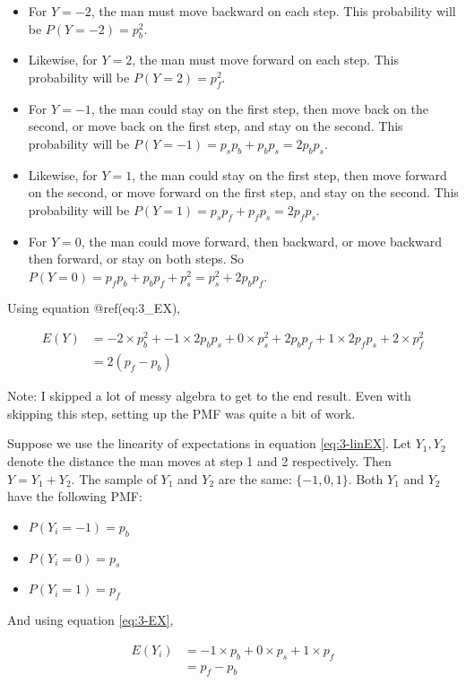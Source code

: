 \documentclass[
]{book}
\providecommand{\tightlist}{%
  \setlength{\itemsep}{0pt}\setlength{\parskip}{0pt}}
\begin{document}
\begin{itemize}
\tightlist
\item
  For \(Y=-2\), the man must move backward on each step. This probability will be \(P(Y=-2) = p_b^2\).
\item
  Likewise, for \(Y=2\), the man must move forward on each step. This probability will be \(P(Y=2) = p_f^2\).
\item
  For \(Y=-1\), the man could stay on the first step, then move back on the second, or move back on the first step, and stay on the second. This probability will be \(P(Y=-1) = p_s p_b + p_b p_s = 2p_b p_s\).
\item
  Likewise, for \(Y=1\), the man could stay on the first step, then move forward on the second, or move forward on the first step, and stay on the second. This probability will be \(P(Y=1) = p_s p_f + p_f p_s = 2p_f p_s\).
\item
  For \(Y=0\), the man could move forward, then backward, or move backward then forward, or stay on both steps. So \(P(Y=0) = p_f p_b + p_b p_f + p_s^2 = p_s^2 + 2 p_b p_f\).
\end{itemize}

Using equation @ref(eq:3\_EX),

\[
\begin{split}
E(Y) &= -2 \times p_b^2 + -1 \times 2p_b p_s + 0 \times p_s^2 + 2 p_b p_f + 1 \times 2p_f p_s + 2 \times p_f^2 \\
       &= 2 (p_f - p_b)
\end{split}
\]

Note: I skipped a lot of messy algebra to get to the end result. Even with skipping this step, setting up the PMF was quite a bit of work.

Suppose we use the linearity of expectations in equation \eqref{eq:3-linEX}. Let \(Y_1, Y_2\) denote the distance the man moves at step 1 and 2 respectively. Then \(Y = Y_1 + Y_2\). The sample of \(Y_1\) and \(Y_2\) are the same: \(\{-1,0,1\}\). Both \(Y_1\) and \(Y_2\) have the following PMF:

\begin{itemize}
\tightlist
\item
  \(P(Y_i = -1) = p_b\)
\item
  \(P(Y_i = 0) = p_s\)
\item
  \(P(Y_i = 1) = p_f\)
\end{itemize}

And using equation \eqref{eq:3-EX},

\[
\begin{split}
E(Y_i) &= -1 \times p_b + 0 \times p_s + 1 \times p_f \\
       &= p_f - p_b
\end{split}
\]
\end{document}
